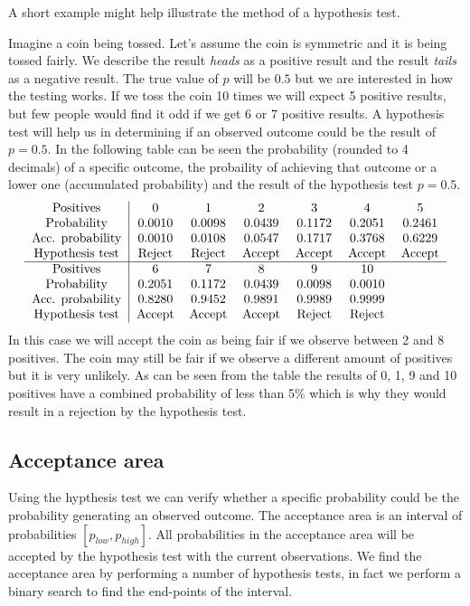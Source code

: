 A short example might help illustrate the method of a hypothesis test.
\begin{example}
\label{ex:coin1}
Imagine a coin being tossed. Let's assume the coin is symmetric and it
is being tossed fairly. We describe the result \emph{heads} as a
positive result and the result \emph{tails} as a negative result. The
true value of $p$ will be $0.5$ but we are interested in how the
testing works. If we toss the coin 10 times we will expect 5 positive
results, but few people would find it odd if we get 6 or 7 positive
results. A hypothesis test will help us in determining if an observed
outcome could be the result of $p=0.5$. In the following table can be
seen the probability (rounded to 4 decimals) of a specific outcome,
the probaility of achieving that outcome or a lower one (accumulated probability) and the result of the
hypothesis test $p=0.5$.\\
\begin{align}
\begin{tabular}{c|cccccc}
Positives       & 0    & 1    & 2    & 3    & 4    & 5\\
Probability     &0.0010&0.0098&0.0439&0.1172&0.2051&0.2461\\
Acc. probability&0.0010&0.0108&0.0547&0.1717&0.3768&0.6229\\
Hypothesis test &Reject&Reject&Accept&Accept&Accept&Accept\\
\hline
Positives  & 6    &7     & 8    & 9     & 10 &\\ 
Probability     &0.2051&0.1172&0.0439&0.0098&0.0010 &\\
Acc. probability&0.8280&0.9452&0.9891&0.9989&0.9999&\\
Hypothesis test &Accept&Accept&Accept&Reject&Reject& 
\end{tabular}
\end{align}
In this case we will accept the coin as being fair if we observe
between 2 and 8 positives. The coin may still be fair if we observe a
different amount of positives but it is very unlikely. As can be seen
from the table the results of 0, 1, 9 and 10 positives have a combined
probability of less than 5$\%$ which is why they would result in a
rejection by the hypothesis test.
\end{example}

\subsection{Acceptance area}
Using the hypthesis test we can verify whether a specific probability
could be the probability generating an observed outcome. The
acceptance area is an interval of
probabilities $[p_{low},p_{high}]$. All probabilities in the
acceptance area will be accepted by the hypothesis test with the
current observations. We find the acceptance area by performing a
number of hypothesis tests, in fact we perform a binary search to find
the end-points of the interval. 

